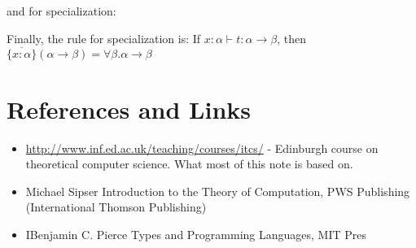 \documentclass{article}
\begin{document}
and for specialization:
\begin{prooftree}
\end{prooftree}

Finally, the rule for specialization is:
\vskip 0.1in
If $x:\alpha \vdash t:\alpha \rightarrow \beta$, then $\overline{\{x:\alpha\}} (\alpha \rightarrow \beta) = \forall \beta.\alpha \rightarrow \beta$

\section{References and Links}
\begin{itemize}
    \item \url{http://www.inf.ed.ac.uk/teaching/courses/itcs/} - Edinburgh course on theoretical computer science. What most of this note is based on.
    \item Michael Sipser Introduction to the Theory of Computation, PWS
        Publishing (International Thomson Publishing)
    \item IBenjamin C. Pierce Types and Programming Languages, MIT Pres
\end{itemize}
\end{document}
